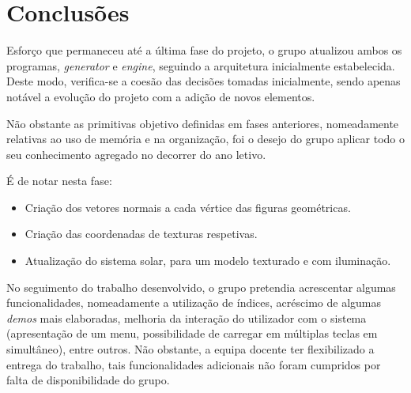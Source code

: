 \documentclass[relatorio.tex]{subfiles}
\begin{document}
\section{Conclusões}
Esforço que permaneceu até a última fase do projeto, o grupo atualizou
ambos os programas, \textit{generator} e \textit{engine},
seguindo a arquitetura inicialmente estabelecida.
Deste modo, verifica-se a coesão das decisões tomadas inicialmente,
sendo apenas notável a evolução do projeto com a adição de novos elementos.

Não obstante as primitivas objetivo definidas em fases anteriores, nomeadamente
relativas ao uso de memória e na organização, foi o desejo do grupo 
aplicar todo o seu conhecimento agregado no decorrer do ano letivo.

É de notar nesta fase:
\begin{itemize}
    \item Criação dos vetores normais a cada vértice das figuras geométricas.
    \item Criação das coordenadas de texturas respetivas.
    \item Atualização do sistema solar, para um modelo texturado e com iluminação.
\end{itemize}

No seguimento do trabalho desenvolvido, o grupo pretendia acrescentar algumas funcionalidades,
nomeadamente a utilização de índices, acréscimo de algumas \textit{demos} mais elaboradas,
melhoria da interação do utilizador com o sistema (apresentação de um menu, possibilidade de 
carregar em múltiplas teclas em simultâneo), entre outros.
Não obstante, a equipa docente ter flexibilizado a entrega do trabalho, 
tais funcionalidades adicionais não foram cumpridos por falta de disponibilidade do grupo.
\end{document}
